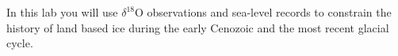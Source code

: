 In this lab you will use $\delta^{18}$O observations and sea-level records to constrain the history of land based ice during the early Cenozoic and the most recent glacial cycle.